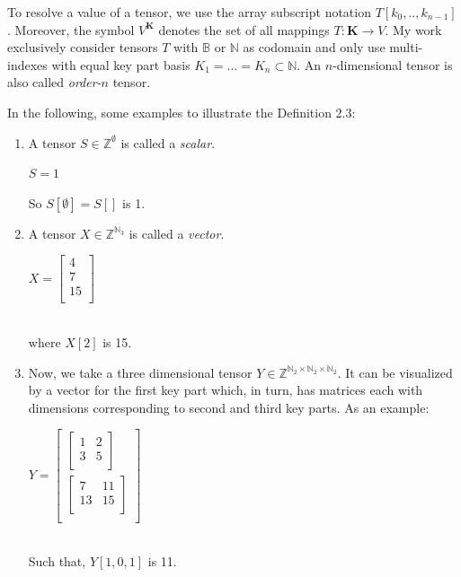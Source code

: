 To resolve a value of a tensor, we use the array subscript notation $T[k_0, .. , k_{n-1}]$. Moreover, the symbol $V^{\textbf{K}}$ denotes the set of all mappings $T: \textbf{K} \to V$. My work exclusively consider tensors $T$ with $\mathbb{B}$ or $\mathbb{N}$ as codomain and only use multi-indexes with equal key part basis $K_1 = ... = K_n \subset \mathbb{N}$. An $n$-dimensional tensor is also called \textit{order-$n$} tensor.
\begin{example}
\label{tensors_examples}
 In the following, some examples to illustrate the Definition 2.3:

\begin{enumerate}
	\item A tensor $S \in \mathbb{Z}^{\emptyset}$ is called a \textit{scalar}.\\
	\centerline{$S = 1$}
	So $S[\emptyset] = S[]$ is 1.
	\item A tensor $X \in \mathbb{Z}^{\mathbb{N}_3}$ is called a \textit{vector}.\\
	\centerline{$X =\left[ \begin{array}{c}
		4 \\ 7 \\ 15\\
		\end{array}\right]$}\\
	where $X[2]$ is 15. 
	\item Now, we take a three dimensional tensor $Y \in \mathbb{Z}^{\mathbb{N}_2 \times \mathbb{N}_2 \times \mathbb{N}_2}$. It can be visualized by a vector for the first key part which, in turn, has matrices each with dimensions corresponding to second and third key parts. As an example:\\
	\centerline{$Y = \left[ 
		\begin{array}{c}
		\left[\begin{array}{cc}  1 & 2 \\ 3 & 5 \\\end{array} \right]\\ 
		\left[\begin{array}{cc} 7 & 11 \\ 13 & 15 \\\end{array} \right]\\ 
		\end{array}
		\right]$}\\
	Such that, $Y[1, 0, 1]$ is 11.
\end{enumerate}
\end{example}

